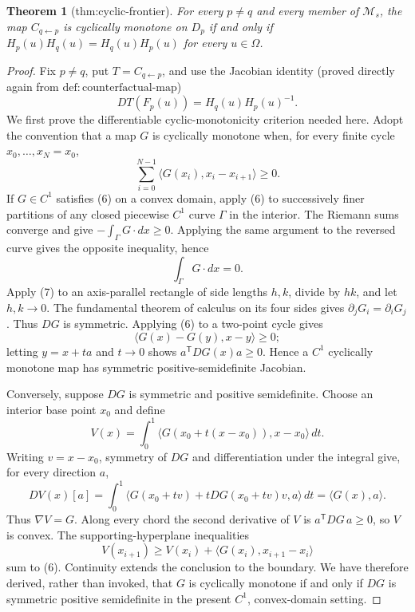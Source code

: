 \documentclass{article}
\newtheorem{theorem}{Theorem}
\begin{document}
\begin{theorem}[thm:cyclic-frontier]\label{thm:cyclic-frontier}
For every \(p\ne q\) and every member of \(\mathcal M_s\), the map \(C_{q\leftarrow p}\) is cyclically monotone on \(D_p\) if and only if \(H_p(u)H_q(u)=H_q(u)H_p(u)\) for every \(u\in\Omega\).
\end{theorem}
\begin{proof}
Fix \(p\ne q\), put \(T=C_{q\leftarrow p}\), and use the Jacobian identity (proved directly again from \(\mathrm{def:counterfactual\text{-}map}\))
\[
 DT(F_p(u))=H_q(u)H_p(u)^{-1}.
 \tag{5}
\]
We first prove the differentiable cyclic-monotonicity criterion needed here.  Adopt the convention that a map \(G\) is cyclically monotone when, for every finite cycle \(x_0,\ldots,x_N=x_0\),
\[
 \sum_{i=0}^{N-1}\langle G(x_i),x_i-x_{i+1}\rangle\ge0.
 \tag{6}
\]
If \(G\in C^1\) satisfies (6) on a convex domain, apply (6) to successively finer partitions of any closed piecewise \(C^1\) curve \(\Gamma\) in the interior.  The Riemann sums converge and give \(-\int_\Gamma G\cdot dx\ge0\).  Applying the same argument to the reversed curve gives the opposite inequality, hence
\[
 \int_\Gamma G\cdot dx=0.
 \tag{7}
\]
Apply (7) to an axis-parallel rectangle of side lengths \(h,k\), divide by \(hk\), and let \(h,k\to0\).  The fundamental theorem of calculus on its four sides gives \(\partial_jG_i=\partial_iG_j\).  Thus \(DG\) is symmetric.  Applying (6) to a two-point cycle gives
\[
 \langle G(x)-G(y),x-y\rangle\ge0;
\]
letting \(y=x+ta\) and \(t\to0\) shows \(a^{\mathsf T}DG(x)a\ge0\).  Hence a \(C^1\) cyclically monotone map has symmetric positive-semidefinite Jacobian.

Conversely, suppose \(DG\) is symmetric and positive semidefinite.  Choose an interior base point \(x_0\) and define
\[
 V(x)=\int_0^1\langle G(x_0+t(x-x_0)),x-x_0\rangle\,dt.
\]
Writing \(v=x-x_0\), symmetry of \(DG\) and differentiation under the integral give, for every direction \(a\),
\[
 DV(x)[a]
 =\int_0^1\langle G(x_0+tv)+tDG(x_0+tv)v,a\rangle\,dt
 =\langle G(x),a\rangle.
 \tag{8}
\]
Thus \(\nabla V=G\).  Along every chord the second derivative of \(V\) is \(a^{\mathsf T}DG\,a\ge0\), so \(V\) is convex.  The supporting-hyperplane inequalities
\[
 V(x_{i+1})\ge V(x_i)+\langle G(x_i),x_{i+1}-x_i\rangle
\]
sum to (6).  Continuity extends the conclusion to the boundary.  We have therefore derived, rather than invoked, that \(G\) is cyclically monotone if and only if \(DG\) is symmetric positive semidefinite in the present \(C^1\), convex-domain setting.


\end{proof}
\end{document}
